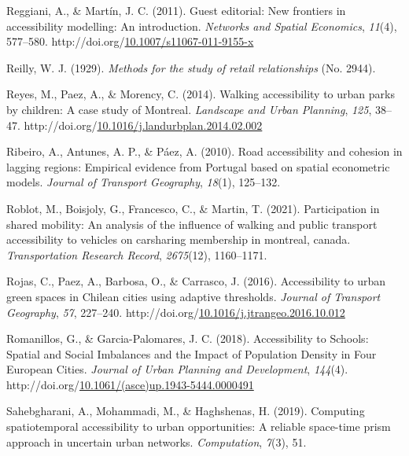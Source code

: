 \documentclass[
11pt, %
oneside, %
english, %
singlespacing, %
]{macthesis} %
\newlength{\cslhangindent}
\newenvironment{CSLReferences}[2] %
{\begin{list}{}{%
	\setlength{\itemindent}{0pt}
	\setlength{\leftmargin}{0pt}
	\setlength{\parsep}{0pt}
	\ifodd #1
	\setlength{\leftmargin}{\cslhangindent}
	\setlength{\itemindent}{-1\cslhangindent}
	\fi
	\setlength{\itemsep}{#2\baselineskip}}}
{\end{list}}
\begin{document}
\begin{CSLReferences}{1}{0}
Reggiani, A., \& Martín, J. C. (2011). Guest editorial: New frontiers in accessibility modelling: An introduction. \emph{Networks and Spatial Economics}, \emph{11}(4), 577--580. http://doi.org/\href{https://doi.org/10.1007/s11067-011-9155-x}{10.1007/s11067-011-9155-x}

Reilly, W. J. (1929). \emph{Methods for the study of retail relationships} (No. 2944).

Reyes, M., Paez, A., \& Morency, C. (2014). Walking accessibility to urban parks by children: {A} case study of {Montreal}. \emph{Landscape and Urban Planning}, \emph{125}, 38--47. http://doi.org/\href{https://doi.org/10.1016/j.landurbplan.2014.02.002}{10.1016/j.landurbplan.2014.02.002}

Ribeiro, A., Antunes, A. P., \& Páez, A. (2010). Road accessibility and cohesion in lagging regions: {Empirical} evidence from {Portugal} based on spatial econometric models. \emph{Journal of Transport Geography}, \emph{18}(1), 125--132.

Roblot, M., Boisjoly, G., Francesco, C., \& Martin, T. (2021). Participation in shared mobility: An analysis of the influence of walking and public transport accessibility to vehicles on carsharing membership in montreal, canada. \emph{Transportation Research Record}, \emph{2675}(12), 1160--1171.

Rojas, C., Paez, A., Barbosa, O., \& Carrasco, J. (2016). Accessibility to urban green spaces in {Chilean} cities using adaptive thresholds. \emph{Journal of Transport Geography}, \emph{57}, 227--240. http://doi.org/\href{https://doi.org/10.1016/j.jtrangeo.2016.10.012}{10.1016/j.jtrangeo.2016.10.012}

Romanillos, G., \& Garcia-Palomares, J. C. (2018). Accessibility to {Schools}: {Spatial} and {Social} {Imbalances} and the {Impact} of {Population} {Density} in {Four} {European} {Cities}. \emph{Journal of Urban Planning and Development}, \emph{144}(4). http://doi.org/\href{https://doi.org/10.1061/(asce)up.1943-5444.0000491}{10.1061/(asce)up.1943-5444.0000491}

Sahebgharani, A., Mohammadi, M., \& Haghshenas, H. (2019). Computing spatiotemporal accessibility to urban opportunities: A reliable space-time prism approach in uncertain urban networks. \emph{Computation}, \emph{7}(3), 51.


\end{CSLReferences}
\end{document}
